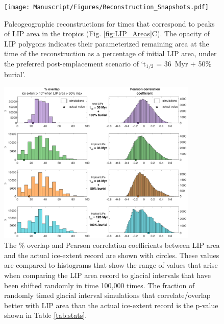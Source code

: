 \documentclass[11pt,letterpaper]{article}
\begin{document}
\begin{figure}[h!]
\begin{center}
	\texttt{[image: Manuscript/Figures/Reconstruction\_Snapshots.pdf]}
	\caption{Paleogeographic reconstructions for times that correspond to peaks of LIP area in the tropics (Fig. \ref{fig:LIP_Areas}C). The opacity of LIP polygons indicates their parameterized remaining area at the time of the reconstruction as a percentage of initial LIP area, under the preferred post-emplacement scenario of `t$_{1/2}$ = 36~Myr + 50\% burial'.}
	\label{fig:Reconstruction_Snapshots}
\end{center}
\end{figure}

\begin{figure}[h!]
\begin{center}
	\includegraphics[width=0.85\textwidth]{Manuscript/Figures/overlap_correlation_cropped.pdf}
	\caption{The \% overlap and Pearson correlation coefficients between LIP area and the actual ice-extent record are shown with circles. These values are compared to histograms that show the range of values that arise when comparing the LIP area record to glacial intervals that have been shifted randomly in time 100,000 times. The fraction of randomly timed glacial interval simulations that correlate/overlap better with LIP area than the actual ice-extent record is the p-value shown in Table \ref{tab:stats}.}
	\label{fig:LIP_correlation}
\end{center}
\end{figure}
\end{document}
